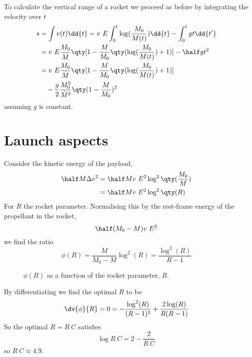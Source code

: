 To calculate the vertical range of a rocket we proceed as before by
integrating the velocity over $t$
\begin{align*} 
s &= \int v(t) \dd{t} = v~E \int_0^t \log( \frac{M_0}{M(t)} ) \dd{t} - \int_0^t g t \dd{t'} \\
&=v~E \frac{M_0}{\dot{M}} \qty[ 1 - \frac{M}{M_0} \qty( \log( \frac{M_0}{M(t)}) + 1 ) ] - \half g t^2 \\
&=v~E \frac{M_0}{\dot{M}} \qty[ 1 - \frac{M}{M_0} \qty( \log( \frac{M_0}{M(t)}) + 1 ) ] \\ & \quad- \frac{g}{2} \frac{M_0^2}{\dot{M}^2} \qty( 1 - \frac{M}{M_0})^2
\end{align*} assuming $g$ is constant.

\section{Launch aspects}
\label{sec:launch-aspects}

Consider the kinetic energy of the payload,
\begin{align*}
  \half M \Delta v^2 &= \half M v~E^2 \log^2\qty(\frac{M_0}{M}) \\ &= \half M v~E^2 \log^2\qty(R)
\end{align*}
For $R$ the rocket parameter. Normalising this by the rest-frame
energy of the propellant in the rocket,
\[ \half (M_0-M) v~E^2 \]
we find the ratio
\begin{equation}
\label{eq:5} \phi(R) = \frac{M}{M_0-M} \log^2(R) = \frac{\log^2(R)}{R-1} 
\end{equation}

\begin{figure}[b]
  \centering
  \caption{$\phi(R)$ as a function of the rocket parameter, $R$.}
  \label{fig:rocket-ratio}
\end{figure}

By differentiating we find the optimal $R$ to be
\begin{equation}
  \label{eq:6}
  \dv{\phi}{R} = 0 = - \frac{\log^2(R)}{(R-1)^2} + \frac{2 \log(R)}{R(R-1)}
\end{equation}
So the optimal $R = R~C$ satisfies
\begin{equation}
  \label{eq:7}
  \log{R~C} = 2 - \frac{2}{R~C}
\end{equation}
so $R~C \approx 4.9$.

